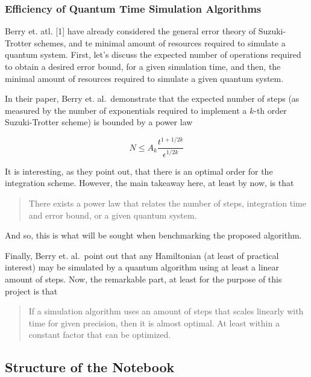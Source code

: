     \hypertarget{efficiency-of-quantum-time-simulation-algorithms}{%
\subsubsection{Efficiency of Quantum Time Simulation
Algorithms}\label{efficiency-of-quantum-time-simulation-algorithms}}

Berry et. atl. {[}1{]} have already considered the general error theory
of Suzuki-Trotter schemes, and te minimal amount of resources required
to simulate a quantum system. First, let's discuss the expected number
of operations required to obtain a desired error bound, for a given
simulation time, and then, the minimal amount of resources required to
simulate a given quantum system.

In their paper, Berry et. al.~demonstrate that the expected number of
steps (as measured by the number of exponentials required to implement a
\(k\)-th order Suzuki-Trotter scheme) is bounded by a power law

\[
N \leq A_k \frac{t^{1+1/2k}}{\epsilon^{1/2k}}
\]

It is interesting, as they point out, that there is an optimal order for
the integration scheme. However, the main takeaway here, at least by
now, is that

\begin{quote}
There exists a power law that relates the number of steps, integration
time and error bound, or a given quantum system.
\end{quote}

And so, this is what will be sought when benchmarking the proposed
algorithm.

Finally, Berry et. al.~point out that any Hamiltonian (at least of
practical interest) may be simulated by a quantum algorithm using at
least a linear amount of steps. Now, the remarkable part, at least for
the purpose of this project is that

\begin{quote}
If a simulation algorithm uses an amount of steps that scales linearly
with time for given precision, then it is almost optimal. At least
within a constant factor that can be optimized.
\end{quote}

    \hypertarget{structure-of-the-notebook}{%
\subsection{Structure of the Notebook}\label{structure-of-the-notebook}}

